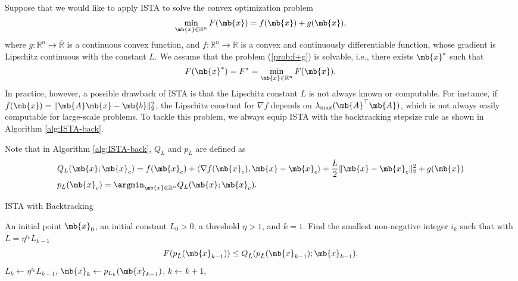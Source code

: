 \begin{exercise}\label{exercise:ISTA-backtracking}
    Suppose that we would like to apply ISTA to solve the convex optimization problem
    \begin{align}\label{prob:f+g}
        \min_{\mb{x}\in\mathbb{R}^n} F(\mb{x})=f(\mb{x})+g(\mb{x}),
    \end{align}
    where $g:\mathbb{R}^n\to\bar{\mathbb{R}}$ is a continuous convex function, and $f:\mathbb{R}^n\to\mathbb{R}$ is a convex and continuously differentiable function, whose gradient is Lipschitz continuous with the constant $L$. We assume that the problem (\ref{prob:f+g}) is solvable, i.e., there exists $\mb{x}^*$ such that
    \begin{align*}
        F(\mb{x}^*)=F^*=\min_{\mb{x}\in\mathbb{R}^n} F(
        \mb{x}).
    \end{align*}
    In practice, however, a possible drawback of ISTA is that the Lipschitz constant $L$ is not always known or computable. For instance, if $f(\mb{x})=\|\mb{A}\mb{x}-\mb{b}\|_2^2$, the Lipschitz constant for $\nabla f$ depends on $\lambda_{\rm max}(\mb{A}^\top\mb{A})$, which is not always easily computable for large-scale problems. To tackle this problem, we always equip ISTA with the backtracking stepsize rule as shown in Algorithm \ref{alg:ISTA-back}.
    \par Note that in Algorithm \ref{alg:ISTA-back}, $Q_L$ and $p_L$ are defined as
    \begin{align*}
         & Q_{L}(\mb{x};\mb{x}_c)=f(\mb{x}_c)+\langle\nabla f(\mb{x}_c),\mb{x}-\mb{x}_c\rangle+\frac{L}{2}\|\mb{x}-\mb{x}_c\|_2^2+g(\mb{x}) \\
         & p_L(\mb{x}_c)=\argmin_{\mb{x}\in\mathbb{R}^n} Q_L(\mb{x};\mb{x}_c).
    \end{align*}

    \begin{center}
        \begin{minipage}{0.9\linewidth}
            \begin{algorithm}[H]
                \caption{ISTA with Backtracking}\label{alg:ISTA-back}

                \begin{algorithmic}[1]
                     An initial point $\mb{x}_0$, an initial  constant $L_0>0$, a threshold $\eta>1$, and $k=1$.
                    \STATE Find the smallest non-negative integer $i_k$ such that with $\tilde{L}=\eta^{i_k}L_{k-1}$
                    \begin{align}\label{eqn:FQ}
                        F(p_{\tilde{L}}(\mb{x}_{k-1}))\le Q_{\tilde{L}}(p_{\tilde{L}}(\mb{x}_{k-1});\mb{x}_{k-1}).
                    \end{align}
                    \STATE $L_k\leftarrow \eta^{i_k}L_{k-1}$, $\mb{x}_k\leftarrow p_{L_k}(\mb{x}_{k-1})$,
                    \STATE $k \leftarrow k+1$,
                    \ENDWHILE


\end{algorithmic}
\end{algorithm}
\end{minipage}
\end{center}
\end{exercise}
